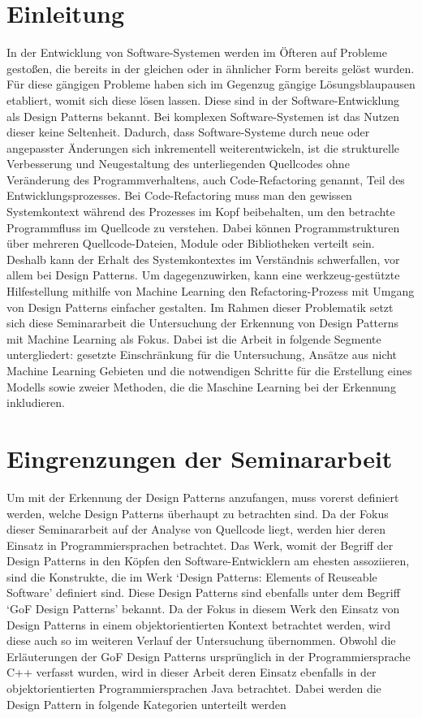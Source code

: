 \documentclass[conference]{IEEEtran}
\begin{document}
\section{Einleitung}
In der Entwicklung von Software-Systemen werden im Öfteren auf Probleme gestoßen, die bereits in der gleichen oder in ähnlicher Form bereits gelöst wurden. Für diese gängigen Probleme haben sich im Gegenzug gängige Lösungsblaupausen etabliert, womit sich diese lösen lassen. Diese sind in der Software-Entwicklung als Design Patterns bekannt.
Bei komplexen Software-Systemen ist das Nutzen dieser keine Seltenheit.
Dadurch, dass Software-Systeme durch neue oder angepasster Änderungen sich inkrementell weiterentwickeln, ist die strukturelle Verbesserung und Neugestaltung des unterliegenden Quellcodes ohne Veränderung des Programmverhaltens, auch Code-Refactoring genannt, Teil des Entwicklungsprozesses.
Bei Code-Refactoring muss man den gewissen Systemkontext während des Prozesses im Kopf beibehalten, um den betrachte Programmfluss im Quellcode zu verstehen.
Dabei können Programmstrukturen über mehreren Quellcode-Dateien, Module oder Bibliotheken verteilt sein. Deshalb kann der Erhalt des Systemkontextes im Verständnis schwerfallen, vor allem bei Design Patterns. Um dagegenzuwirken, kann eine werkzeug-gestützte Hilfestellung mithilfe von Machine Learning den Refactoring-Prozess mit Umgang von Design Patterns einfacher gestalten.
Im Rahmen dieser Problematik setzt sich diese Seminararbeit die Untersuchung der Erkennung von Design Patterns mit Machine Learning als Fokus. Dabei ist die Arbeit in folgende Segmente untergliedert: gesetzte Einschränkung für die Untersuchung, Ansätze aus nicht Machine Learning Gebieten und die notwendigen Schritte für die Erstellung eines Modells sowie zweier Methoden, die die Maschine Learning bei der Erkennung inkludieren.


\section{Eingrenzungen der Seminararbeit}
Um mit der Erkennung der Design Patterns anzufangen, muss vorerst definiert werden, welche Design Patterns überhaupt zu betrachten sind. Da der Fokus dieser Seminararbeit auf der Analyse von Quellcode liegt, werden hier deren Einsatz in Programmiersprachen betrachtet.
Das Werk, womit der Begriff der Design Patterns in den Köpfen den Software-Entwicklern am ehesten assoziieren, sind die Konstrukte, die im Werk `Design Patterns: Elements of Reuseable Software' definiert \cite{gamma1994design} sind. Diese Design Patterns sind ebenfalls unter dem Begriff `GoF Design Patterns' bekannt. Da der Fokus in diesem Werk den Einsatz von Design Patterns in einem
objektorientierten Kontext betrachtet werden, wird diese auch so im weiteren Verlauf der Untersuchung übernommen. Obwohl die Erläuterungen der GoF Design Patterns ursprünglich in der Programmiersprache C++ verfasst wurden, wird in dieser Arbeit deren Einsatz ebenfalls in der objektorientierten Programmiersprachen Java betrachtet.
Dabei werden die Design Pattern in folgende Kategorien unterteilt werden \cite[p. 5797]{Yarahmadi2020}
\end{document}
